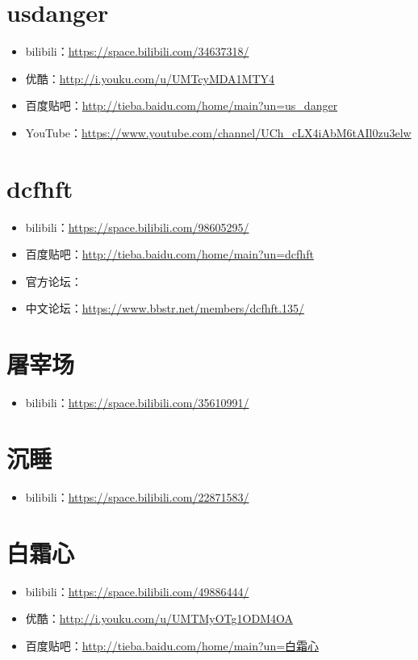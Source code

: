 \section{usdanger}
\begin{itemize}
    \item bilibili：\url{https://space.bilibili.com/34637318/}
    \item 优酷：\url{http://i.youku.com/u/UMTcyMDA1MTY4}
    \item 百度贴吧：\url{http://tieba.baidu.com/home/main?un=us_danger}
    \item YouTube：\url{https://www.youtube.com/channel/UCh_cLX4iAbM6tAIl0zu3elw}
\end{itemize}
\section{dcfhft}
\begin{itemize}
    \item bilibili：\url{https://space.bilibili.com/98605295/}
    \item 百度贴吧：\url{http://tieba.baidu.com/home/main?un=dcfhft}
    \item 官方论坛：
    \item 中文论坛：\url{https://www.bbstr.net/members/dcfhft.135/}
\end{itemize}
\section{屠宰场}
\begin{itemize}
    \item bilibili：\url{https://space.bilibili.com/35610991/}
\end{itemize}
\section{沉睡}
\begin{itemize}
    \item bilibili：\url{https://space.bilibili.com/22871583/}
\end{itemize}
\section{白霜心}
\begin{itemize}
    \item bilibili：\url{https://space.bilibili.com/49886444/}
    \item 优酷：\url{http://i.youku.com/u/UMTMyOTg1ODM4OA}
    \item 百度贴吧：\url{http://tieba.baidu.com/home/main?un=白霜心}
\end{itemize}
